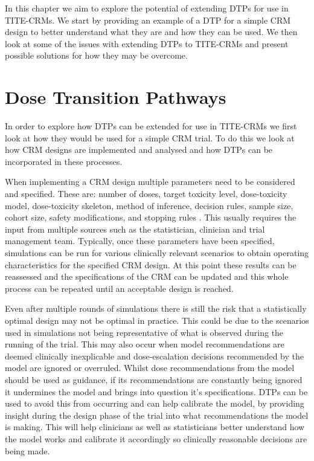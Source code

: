 In this chapter we aim to explore the potential of extending DTPs for use in TITE-CRMs. We start by providing an example of a DTP for a simple CRM design to better understand what they are and how they can be used. We then look at some of the issues with extending DTPs to TITE-CRMs and present possible solutions for how they may be overcome.



\section{Dose Transition Pathways}
\label{tite-dtp:DTPs}

In order to explore how DTPs can be extended for use in TITE-CRMs we first look at how they would be used for a simple CRM trial. To do this we look at how CRM designs are implemented and analysed and how DTPs can be incorporated in these processes. 

When implementing a CRM design multiple parameters need to be considered and specified. These are: number of doses, target toxicity level, dose-toxicity model, dose-toxicity skeleton, method of inference, decision rules, sample size, cohort size, safety modifications, and stopping rules \cite{wheelerHowDesignDosefinding2019}. This usually requires the input from multiple sources such as the statistician, clinician and trial management team. Typically, once these parameters have been specified, simulations can be run for various clinically relevant scenarios to obtain operating characteristics for the specified CRM design. At this point these results can be reassessed and the specifications of the CRM can be updated  and this whole process can be repeated until an acceptable design is reached. 

Even after multiple rounds of simulations there is still the risk that a statistically optimal design may not be optimal in practice. This could be due to the scenarios used in simulations not being representative of what is observed during the running of the trial. This may also occur when model recommendations are deemed clinically inexplicable and dose-escalation decisions recommended by the model are ignored or overruled. Whilst dose recommendations from the model should be used as guidance, if its recommendations are constantly being ignored it undermines the model and brings into question it's specifications. DTPs can be used to avoid this from occurring and can help calibrate the model, by providing insight during the design phase of the trial into what recommendations the model is making. This will help clinicians as well as statisticians better understand how the model works and calibrate it accordingly so clinically reasonable decisions are being made.   

